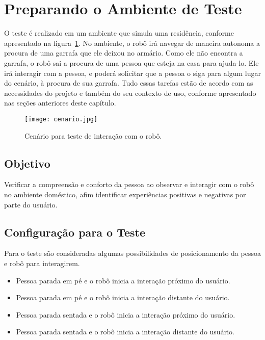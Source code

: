 \section{Preparando o Ambiente de Teste}
\label{sec:ambienteteste}
O teste é realizado em um ambiente que simula uma residência, conforme apresentado na figura~\ref{fig:cenario}. No ambiente, o robô irá navegar de maneira autonoma a procura de uma garrafa que ele deixou no armário. Como ele não encontra a garrafa, o robô sai a procura de uma pessoa que esteja na casa para ajuda-lo. Ele irá interagir com a pessoa, e poderá solicitar que a pessoa o siga para algum lugar do cenário, à procura de sua garrafa. Tudo essas tarefas estão de acordo com as necessidades do projeto e também do seu contexto de uso, conforme apresentado nas seções anteriores deste capítulo.

\begin{figure}[ht!]
	\centering
	\begin{minipage}{\textwidth}
		\caption{Cenário para teste de interação com o robô.}
		\texttt{[image: cenario.jpg]}
		\label{fig:cenario}
	\end{minipage}
\end{figure}

\subsection{Objetivo}

Verificar a compreensão e conforto da pessoa ao observar e interagir com o robô no ambiente doméstico, afim identificar experiências positivas e negativas por parte do usuário.

\subsection{Configuração para o Teste}

Para o teste são consideradas algumas possibilidades de posicionamento da pessoa e robô para interagirem.

\begin{itemize}
	\item Pessoa parada em pé e o robô inicia a interação próximo do usuário.
	\item Pessoa parada em pé e o robô inicia a interação distante do usuário.
	\item Pessoa parada sentada e o robô inicia a interação próximo do usuário.
	\item Pessoa parada sentada e o robô inicia a interação distante do usuário.
\end{itemize}

